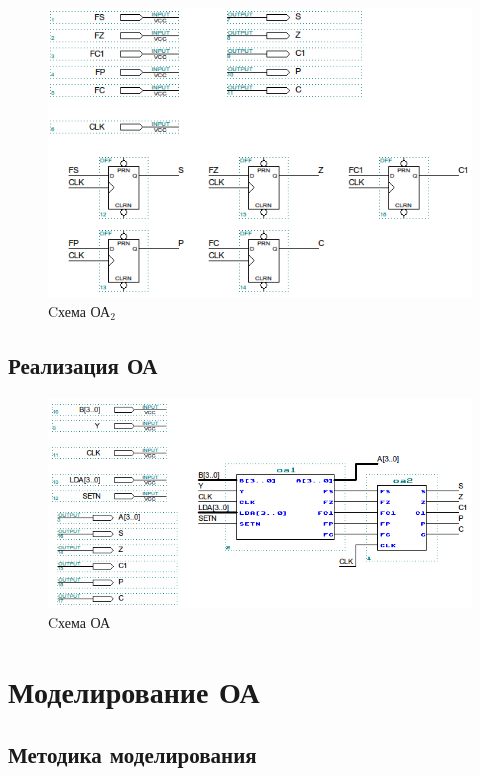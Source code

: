 \begin{figure}[H]
	\includegraphics[scale=0.6]{images/altera/oa2.png}
	\caption{Cхема ОА$_{2}$}
	\label{figure:oa2log}
\end{figure}

\subsection{Реализация ОА}

\begin{figure}[H]
	\includegraphics[scale=0.6]{images/altera/oa.png}
	\caption{Cхема ОА}
	\label{figure:oalog}
\end{figure}

\newpage
\section{Моделирование ОА}

\subsection{Методика моделирования}

